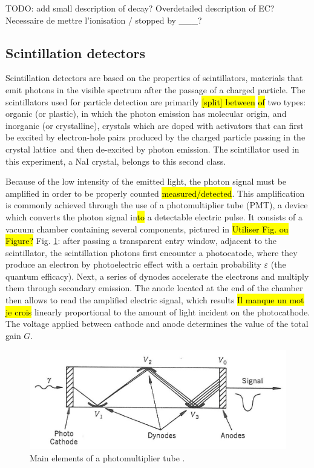 TODO: add small description of \cobalt decay?
Overdetailed description of EC?
Necessaire de mettre l'ionisation / stopped by \_\_\_?


\subsection{Scintillation detectors}
\label{sec:scinitillators}

Scintillation detectors are based on the properties of scintillators, materials that emit photons in the visible spectrum after the passage of a charged particle.
The scintillators used for particle detection are primarily \hl{[split] between} \hl{of} two types: organic (or plastic), in which the photon emission has molecular origin, 
and inorganic (or crystalline), crystals which are doped with activators that can first be excited by electron-hole pairs 
produced by the charged particle passing in the crystal lattice\footnotemark\ and then de-excited by photon emission\cite{intro_nuclear_particle_physics}.
The scintillator used in this experiment, a NaI crystal, belongs to this second class.

Because of the low intensity of the emitted light, the photon signal must be amplified in order to be properly counted \hl{measured/detected}.
This amplification is commonly achieved through the use of a photomultiplier tube (PMT), a device which converts the photon signal in\hl{to} a detectable electric pulse.
It consists of a vacuum chamber containing several components, pictured in \hl{Utiliser Fig. ou Figure?} Fig. \ref{fig:photomultiplier}: 
after passing a transparent entry window, adjacent to the scintillator, the scintillation photons first encounter a photocatode, 
where they produce an electron by photoelectric effect with a certain probability $\varepsilon$ (the quantum efficacy).
Next, a series of dynodes accelerate the electrons and multiply them through secondary emission.
The anode located at the end of the chamber then allows to read the amplified electric signal, 
which results \hl{Il manque un mot je crois} linearly proportional to the amount of light incident on the photocathode.
The voltage applied between cathode and anode determines the value of the total gain $G$.
%
\begin{figure}[htbp]
    \centering
    \includegraphics[scale=1.2]{figures/photomultiplier.jpg}
    \caption{Main elements of a photomultiplier tube \cite{intro_nuclear_particle_physics}.}
    \label{fig:photomultiplier}
\end{figure}

